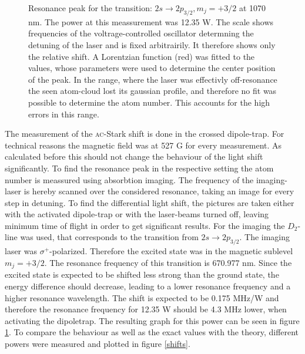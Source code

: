 \begin{figure}[H]
\caption{Resonance peak for the transition: $2s\rightarrow2p_{3/2}, m_j=+3/2$ at 1070 nm. The power at this meassurement was 12.35 W. The scale shows frequencies of the voltrage-controlled oscillator determning the detuning of the laser and is fixed arbitrairily. It therefore shows only the relative shift. A Lorentzian function (red) was fitted to the values, whose parameters were used to determine the center position of the peak. In the range, where the laser was effectivly off-resonance the seen atom-cloud lost its gaussian profile, and therefore no fit was possible to determine the atom number. This accounts for the high errors in this range.}
\label{resonance}
\end{figure}

The measurement of the \textsc{ac}-Stark shift is done in the crossed dipole-trap. For technical reasons the magnetic field was at 527 G for every measurement. As calculated before this should not change the behaviour of the light shift significantly. To find the resonance peak in the respective setting the atom number is meassured using absorbtion imaging. The frequency of the imaging-laser is hereby scanned over the considered resonance, taking an image for every step in detuning. To find the differential light shift, the pictures are taken either with the activated dipole-trap or with the laser-beams turned off, leaving minimum time of flight in order to get significant results. For the imaging the $D_2$-line was used, that corresponds to the transition from  $2s\rightarrow2p_{3/2}$. The imaging laser was $\sigma^+$-polarized. Therefore the excited state was in the magnetic sublevel $m_j=+3/2$. The resonance frequency of this transition is 670.977 nm. Since the excited state is expected to be shifted less strong than the ground state, the energy difference should decrease, leading to a lower resonance frequency and a higher resonance wavelength. The shift is expected to be 0.175 MHz/W and therefore the resonance frequency for 12.35 W should be 4.3 MHz lower, when activating the dipoletrap. The resulting graph for this power can be seen in figure \ref{resonance}. To compare the behaviour as well as the exact values with the theory, different powers were measured and plotted in figure \ref{shifts}. 


